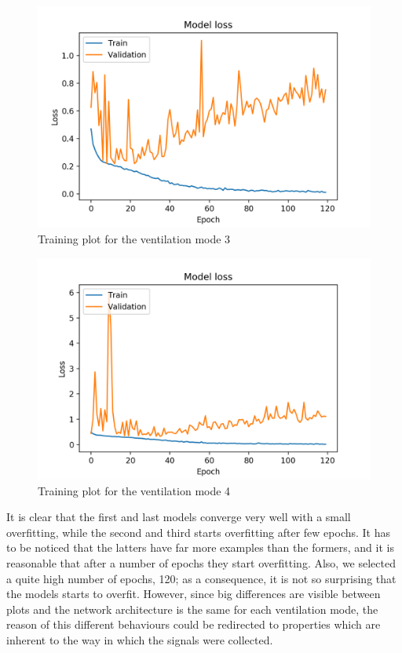 \documentclass[a4paper, twoside]{article}
\begin{document}
    \begin{figure}[H]
        \centering
        \includegraphics[width=0.9\linewidth]{mode_3_conv_1.png}
        \caption{Training plot for the ventilation mode 3}
    \end{figure}

    \begin{figure}[H]
        \centering
        \includegraphics[width=0.9\linewidth]{mode_4_conv_1.png}
        \caption{Training plot for the ventilation mode 4}
    \end{figure}

It is clear that the first and last models converge very well with a small overfitting, while the second and third starts overfitting after few epochs. It has to be noticed that the latters have far more examples than the formers, and it is reasonable that after a number of epochs they start overfitting. Also, we selected a quite high number of epochs, 120; as a consequence, it is not so surprising that the models starts to overfit. However, since big differences are visible between plots and the network architecture is the same for each ventilation mode, the reason of this different behaviours could be redirected to properties which are inherent to the way in which the signals were collected.
\end{document}
